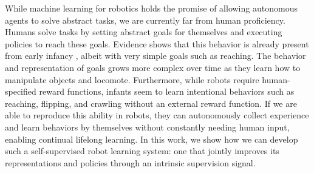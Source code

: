 \iffalse

While machine learning for robotics holds the promise of allowing autonomous agents to solve abstract tasks, we are currently far from human proficiency. Humans solve tasks by setting abstract
goals for themselves and executing policies to reach these goals. Evidence shows that this behavior is already present from early infancy \cite{smith2005development}, albeit with very simple goals such as reaching.
The behavior and representation of goals grows more complex over time as they learn how to manipulate objects and locomote. 
Furthermore, while robots require human-specified reward functions, infants seem to learn intentional behaviors such as reaching, flipping, and crawling without an external reward function.
If we are able to reproduce this ability in robots, they can autonomously collect experience and learn behaviors by themselves without constantly needing human input, enabling continual lifelong learning.
In this work, we show how we can develop such a self-supervised robot learning system:
one that jointly improves its representations and policies through an intrinsic supervision signal.


